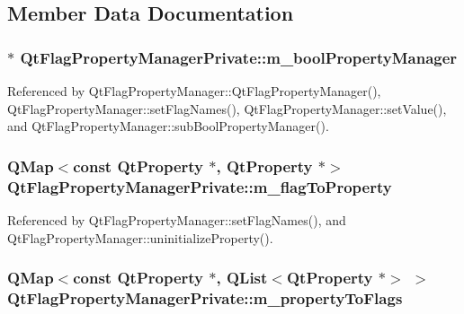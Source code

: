 \subsection{Member Data Documentation}
\subsubsection[{m\+\_\+bool\+Property\+Manager}]{$\ast$ Qt\+Flag\+Property\+Manager\+Private\+::m\+\_\+bool\+Property\+Manager}\label{classQtFlagPropertyManagerPrivate_ae41b8d3e8b141292994c25be1a246de5}


Referenced by Qt\+Flag\+Property\+Manager\+::\+Qt\+Flag\+Property\+Manager(), Qt\+Flag\+Property\+Manager\+::set\+Flag\+Names(), Qt\+Flag\+Property\+Manager\+::set\+Value(), and Qt\+Flag\+Property\+Manager\+::sub\+Bool\+Property\+Manager().

\subsubsection[{m\+\_\+flag\+To\+Property}]{\setlength{\rightskip}{0pt plus 5cm}Q\+Map$<$const {\bf Qt\+Property} $\ast$, {\bf Qt\+Property} $\ast$$>$ Qt\+Flag\+Property\+Manager\+Private\+::m\+\_\+flag\+To\+Property}\label{classQtFlagPropertyManagerPrivate_a3e36ce557aaf46e9b4ab59f1e14031e5}


Referenced by Qt\+Flag\+Property\+Manager\+::set\+Flag\+Names(), and Qt\+Flag\+Property\+Manager\+::uninitialize\+Property().

\subsubsection[{m\+\_\+property\+To\+Flags}]{\setlength{\rightskip}{0pt plus 5cm}Q\+Map$<$const {\bf Qt\+Property} $\ast$, Q\+List$<${\bf Qt\+Property} $\ast$$>$ $>$ Qt\+Flag\+Property\+Manager\+Private\+::m\+\_\+property\+To\+Flags}\label{classQtFlagPropertyManagerPrivate_a8a2132441007d02992289e2f95d48693}


